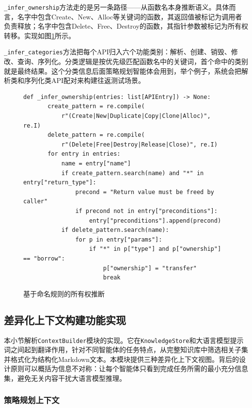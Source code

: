 \texttt{\_infer\_ownership}方法走的是另一条路径——从函数名本身推断语义。具体而言，名字中包含Create、New、Alloc等关键词的函数，其返回值被标记为调用者负责释放；名字中包含Delete、Free、Destroy的函数，其指针参数被标记为所有权转移。实现如图\ref{fig:infer-ownership}所示。

\texttt{\_infer\_categories}方法把每个API归入六个功能类别：解析、创建、销毁、修改、查询、序列化。分类逻辑是按优先级匹配函数名中的关键词，首个命中的类别就是最终结果。这个分类信息后面策略规划智能体会用到，举个例子，系统会把解析类和序列化类API配对来构建往返测试场景。

\begin{figure}[H]
    \centering
    \begin{lstlisting}[style=style@python]
   def _infer_ownership(entries: list[APIEntry]) -> None:
       create_pattern = re.compile(
           r"(Create|New|Duplicate|Copy|Clone|Alloc)", re.I)
       delete_pattern = re.compile(
           r"(Delete|Free|Destroy|Release|Close)", re.I)
       for entry in entries:
           name = entry["name"]
           if create_pattern.search(name) and "*" in entry["return_type"]:
               precond = "Return value must be freed by caller"
               if precond not in entry["preconditions"]:
                   entry["preconditions"].append(precond)
           if delete_pattern.search(name):
               for p in entry["params"]:
                   if "*" in p["type"] and p["ownership"] == "borrow":
                       p["ownership"] = "transfer"
                       break
    \end{lstlisting}
    \caption{基于命名规则的所有权推断}
    \label{fig:infer-ownership}
\end{figure}

\subsection{差异化上下文构建功能实现}

本小节解析\texttt{ContextBuilder}模块的实现。它在\texttt{KnowledgeStore}和大语言模型提示词之间起到翻译作用，针对不同智能体的任务特点，从完整知识库中筛选相关子集并格式化为结构化Markdown文本。本模块提供三种差异化上下文视图。背后的设计原则可以概括为信息不对称：让每个智能体只看到完成任务所需的最小充分信息集，避免无关内容干扰大语言模型推理。

\subsubsection{策略规划上下文}

